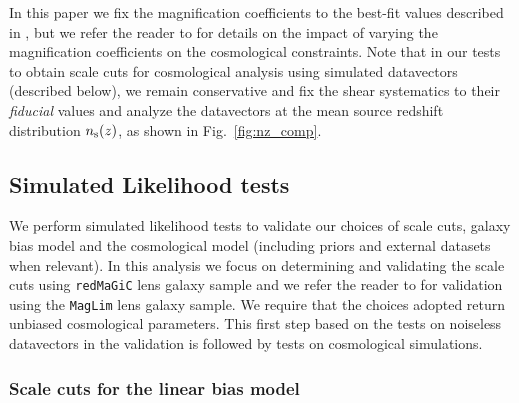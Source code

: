 \documentclass[aps, prd,twocolumn,superscriptaddress,nofootinbib,preprintnumbers]{revtex4-1}
\newcommand{\redmagic}{\texttt{redMaGiC} }
\newcommand{\maglim}{\texttt{MagLim} }
\newcommand{\SP}[1]{{\color{orange}[SP: #1]}}
\newcommand{\gary}[1]{\textcolor{red}{#1}}
\begin{document}
In this paper we fix the magnification coefficients to the best-fit values described in \citet*{y3-2x2ptmagnification, y3-generalmethods}, but we refer the reader to \citet*{y3-2x2ptmagnification} for details on the impact of varying the magnification coefficients on the cosmological constraints. 
Note that in our tests to obtain scale cuts for cosmological analysis using simulated datavectors (described below),  we remain conservative and fix the shear systematics to their \textit{fiducial} values and analyze the datavectors at the mean source redshift distribution $n_{\rm s}(z)$, as shown in Fig.~\ref{fig:nz_comp}. 






\subsection{Simulated Likelihood tests}\label{sec:simlike_analysis}


We perform simulated likelihood tests to validate our choices of scale cuts, galaxy bias model and the cosmological model (including priors and external datasets when relevant). In this analysis we focus on determining and validating the scale cuts using \redmagic lens galaxy sample and we refer the reader to \citet{y3-2x2ptaltlensresults} for validation using the \maglim lens galaxy sample. We require that the choices adopted return unbiased cosmological parameters. This first step based on the tests on noiseless datavectors in the validation is followed by tests on cosmological simulations. 

\subsubsection{Scale cuts for the linear bias model}
\label{sec:sc_linbias}

\end{document}
